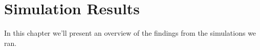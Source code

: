 \chapter{Simulation Results}

In this chapter we'll present an overview of the findings from the simulations we ran.
